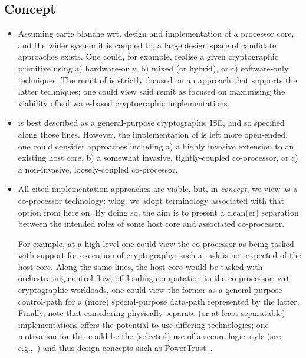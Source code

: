 
\subsection{Concept}
\label{sec:bg:concept}

\begin{itemize}

\item Assuming carte blanche wrt. design and implementation of a processor 
      core, and the wider system it is coupled to, a large design space of 
      candidate approaches exists.  One could, for example, realise a given 
      cryptographic primitive using
      a) hardware-only,
      b) mixed (or hybrid),
         or
      c) software-only
      techniques.
      The remit of \XCID is strictly focused on an approach that supports the
      latter techniques; one could view said remit as focused on maximising
      the viability of software-based cryptographic implementations.

\item \XCID is best described as a general-purpose cryptographic ISE, and so
      specified along those lines.  However, the implementation of \XCID is
      left more open-ended: one could consider approaches including
      a) a highly   invasive extension to an existing host core,
      b) a somewhat invasive, tightly-coupled co-processor,
         or
      c) a      non-invasive, loosely-coupled co-processor.

\item All cited implementation approaches are viable, but, in {\em concept},
      we view \XCID as a co-processor technology: wlog. we adopt terminology 
      associated with that option from here on.  By doing so, the aim is to 
      present a clean(er) separation between the intended roles of some host 
      core and associated \XCID co-processor.

      For example, at a high level one could view the co-processor as being 
      tasked with support for execution of cryptography; such a task is not
      expected of the host core.  Along the same lines, the host core would
      be tasked with orchestrating control-flow, off-loading computation to
      the co-processor: wrt. cryptographic workloads, one could view the
      former as a general-purpose control-path for a (more) special-purpose 
      data-path represented by the latter.  Finally, note that considering
      physically separate (or at least separatable) implementations offers
      the potential to use differing technologies; one motivation for this 
      could be the (selected) use of a secure logic style 
      (see, e.g.,~\cite{SCARV:MayMur:16})
      and thus design concepts such as PowerTrust~\cite{SCARV:TilKirSze:10}.


\end{itemize}
